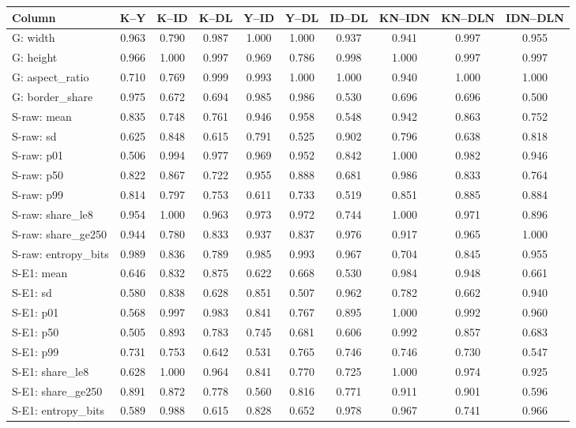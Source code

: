 \begin{tabular}{@{}lccccccccc@{}}
\toprule
Column & K--Y & K--ID & K--DL & Y--ID & Y--DL & ID--DL & KN--IDN & KN--DLN & IDN--DLN \\
\midrule
G: width & 0.963 & 0.790 & 0.987 & 1.000 & 1.000 & 0.937 & 0.941 & 0.997 & 0.955 \\
G: height & 0.966 & 1.000 & 0.997 & 0.969 & 0.786 & 0.998 & 1.000 & 0.997 & 0.997 \\
G: aspect\_ratio & 0.710 & 0.769 & 0.999 & 0.993 & 1.000 & 1.000 & 0.940 & 1.000 & 1.000 \\
G: border\_share & 0.975 & 0.672 & 0.694 & 0.985 & 0.986 & 0.530 & 0.696 & 0.696 & 0.500 \\
S-raw: mean & 0.835 & 0.748 & 0.761 & 0.946 & 0.958 & 0.548 & 0.942 & 0.863 & 0.752 \\
S-raw: sd & 0.625 & 0.848 & 0.615 & 0.791 & 0.525 & 0.902 & 0.796 & 0.638 & 0.818 \\
S-raw: p01 & 0.506 & 0.994 & 0.977 & 0.969 & 0.952 & 0.842 & 1.000 & 0.982 & 0.946 \\
S-raw: p50 & 0.822 & 0.867 & 0.722 & 0.955 & 0.888 & 0.681 & 0.986 & 0.833 & 0.764 \\
S-raw: p99 & 0.814 & 0.797 & 0.753 & 0.611 & 0.733 & 0.519 & 0.851 & 0.885 & 0.884 \\
S-raw: share\_le8 & 0.954 & 1.000 & 0.963 & 0.973 & 0.972 & 0.744 & 1.000 & 0.971 & 0.896 \\
S-raw: share\_ge250 & 0.944 & 0.780 & 0.833 & 0.937 & 0.837 & 0.976 & 0.917 & 0.965 & 1.000 \\
S-raw: entropy\_bits & 0.989 & 0.836 & 0.789 & 0.985 & 0.993 & 0.967 & 0.704 & 0.845 & 0.955 \\
S-E1: mean & 0.646 & 0.832 & 0.875 & 0.622 & 0.668 & 0.530 & 0.984 & 0.948 & 0.661 \\
S-E1: sd & 0.580 & 0.838 & 0.628 & 0.851 & 0.507 & 0.962 & 0.782 & 0.662 & 0.940 \\
S-E1: p01 & 0.568 & 0.997 & 0.983 & 0.841 & 0.767 & 0.895 & 1.000 & 0.992 & 0.960 \\
S-E1: p50 & 0.505 & 0.893 & 0.783 & 0.745 & 0.681 & 0.606 & 0.992 & 0.857 & 0.683 \\
S-E1: p99 & 0.731 & 0.753 & 0.642 & 0.531 & 0.765 & 0.746 & 0.746 & 0.730 & 0.547 \\
S-E1: share\_le8 & 0.628 & 1.000 & 0.964 & 0.841 & 0.770 & 0.725 & 1.000 & 0.974 & 0.925 \\
S-E1: share\_ge250 & 0.891 & 0.872 & 0.778 & 0.560 & 0.816 & 0.771 & 0.911 & 0.901 & 0.596 \\
S-E1: entropy\_bits & 0.589 & 0.988 & 0.615 & 0.828 & 0.652 & 0.978 & 0.967 & 0.741 & 0.966 \\
\bottomrule
\end{tabular}
